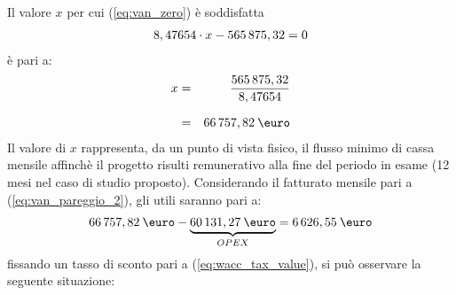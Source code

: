 Il valore $x$ per cui (\ref{eq:van_zero}) è soddisfatta 
	\begin{equation}
	\label{eq:van_pareggio_1}
	\begin{split}
 		8,47654 \cdot x - 565\thinspace 875,32 = 0	
 	\end{split}
	\end{equation}
è pari a:
	\begin{eqnarray}
	\label{eq:van_pareggio_2}
		x & = & \frac{565\thinspace 875,32	}{8,47654}	 	\nonumber \\[1.5ex] 
		  & = &  66\thinspace 757,82 \: \mbox{\euro} 
	\end{eqnarray}
Il valore di $x$ rappresenta, da un punto di vista fisico, il flusso minimo di cassa mensile affinchè il progetto risulti remunerativo alla fine del periodo in esame (12 mesi nel caso di studio proposto). \newline
Considerando il fatturato mensile pari a (\ref{eq:van_pareggio_2}), gli utili saranno pari a:
	\begin{equation}
	\label{eq:flussi_netti}
	\begin{split}
 		66\thinspace 757,82 \: \mbox{\euro} - \underbrace{60\thinspace 131,27 \: \mbox{\euro}}_{OPEX} = 6\thinspace 626,55 \: \mbox{\euro}	
 	\end{split}
	\end{equation}
fissando un tasso di sconto pari a (\ref{eq:wacc_tax_value}), si può osservare la seguente situazione:
%
%
